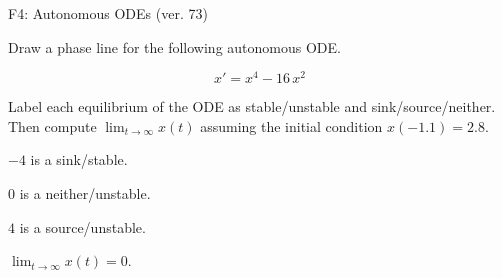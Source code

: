 \begin{exercise}
  \begin{exerciseTitle}F4: Autonomous ODEs (ver. 73)\end{exerciseTitle}
  \begin{exerciseStatement}
    

      Draw a phase line for the following 
      autonomous ODE.
    

    
\[x'= x^{4} - 16 \, x^{2}\]

    

      Label each equilibrium of the ODE
      as stable/unstable and sink/source/neither.
      Then compute \(\lim_{t\to\infty}x(t)\)
      assuming the initial condition
      \(x( -1.1 )= 2.8\).
    

  \end{exerciseStatement}
  \begin{exerciseAnswer}
    

      \(-4\) is a sink/stable.
      
        \(0\) is a neither/unstable.
      
      \(4\) is a source/unstable.
    

    

      \(\lim_{t\to\infty}x(t)=0\).
    

  \end{exerciseAnswer}
\end{exercise}